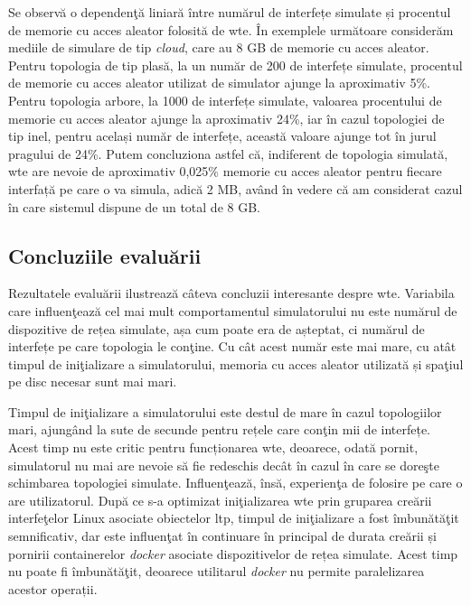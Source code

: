 Se observă o dependenţă liniară între numărul de interfețe simulate și procentul de memorie cu acces aleator folosită de \gls{wte}. În exemplele următoare considerăm mediile de simulare de tip \textit{cloud}, care au 8 GB de memorie cu acces aleator. Pentru topologia de tip plasă, la un număr de 200 de interfețe simulate, procentul de memorie cu acces aleator utilizat de simulator ajunge la aproximativ 5\%. Pentru topologia arbore, la 1000 de interfețe simulate, valoarea procentului de memorie cu acces aleator ajunge la aproximativ 24\%, iar în cazul topologiei de tip inel, pentru același număr de interfețe, această valoare ajunge tot în jurul pragului de 24\%. Putem concluziona astfel că, indiferent de topologia simulată, \gls{wte} are nevoie de aproximativ 0,025\% memorie cu acces aleator pentru fiecare interfață pe care o va simula, adică 2 MB, având în vedere că am considerat cazul în care sistemul dispune de un total de 8 GB.

\subsection{Concluziile evaluării}

Rezultatele evaluării ilustrează câteva concluzii interesante despre \gls{wte}. Variabila care influenţează cel mai mult comportamentul simulatorului nu este numărul de dispozitive de rețea simulate, așa cum poate era de așteptat, ci numărul de interfețe pe care topologia le conţine. Cu cât acest număr este mai mare, cu atât timpul de iniţializare a simulatorului, memoria cu acces aleator utilizată și spaţiul pe disc necesar sunt mai mari.

Timpul de iniţializare a simulatorului este destul de mare în cazul topologiilor mari, ajungând la sute de secunde pentru rețele care conţin mii de interfețe. Acest timp nu este critic pentru funcționarea \gls{wte}, deoarece, odată pornit, simulatorul nu mai are nevoie să fie redeschis decât în cazul în care se doreşte schimbarea topologiei simulate. Influenţează, însă, experienţa de folosire pe care o are utilizatorul. După ce s-a optimizat iniţializarea \gls{wte} prin gruparea creării interfeţelor Linux asociate obiectelor \gls{ltp}, timpul de iniţializare a fost îmbunătăţit semnificativ, dar este influenţat în continuare în principal de durata creării și pornirii containerelor \textit{docker} asociate dispozitivelor de rețea simulate. Acest timp nu poate fi îmbunătăţit, deoarece utilitarul \textit{docker} nu permite paralelizarea acestor operații.

